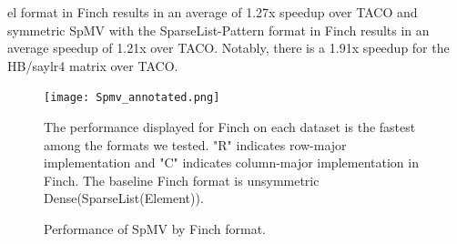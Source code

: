 el format in Finch results in an average of 1.27x speedup over TACO and symmetric SpMV with the SparseList-Pattern format in Finch results in an average speedup of 1.21x over TACO. Notably, there is a 1.91x speedup for the HB/saylr4 matrix over TACO. 






\begin{figure}
    \texttt{[image: Spmv\_annotated.png]}
    \caption{Performance of SpMV by Finch format.}
    \label{fig:spmv_grouped}
    \footnotesize The performance displayed for Finch on each dataset is the fastest among the formats we tested. "R" indicates row-major implementation and "C" indicates column-major implementation in Finch. The baseline Finch format is unsymmetric Dense(SparseList(Element)).
\end{figure}

